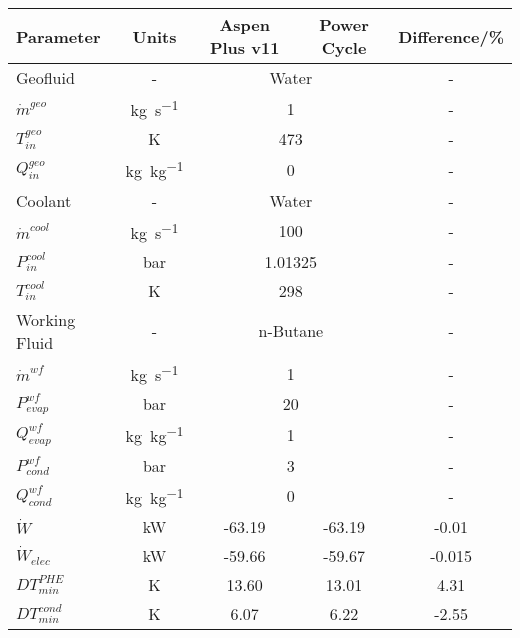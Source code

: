 \begin{tabular}{|p{3cm} c c c c|}
    \hline
    \rowcolor{bluepoli!40} %
    \textbf{Parameter} & \textbf{Units} & \textbf{Aspen Plus v11} & \textbf{Power Cycle} & \textbf{Difference/\unit{\percent}} \T\B \\
    \hline \hline
    Geofluid & - & \multicolumn{2}{c}{Water} & - \T\B\\
    \(\Dot{m}^{geo}\)  & \unit{\kg\per\s} & \multicolumn{2}{c}{\num{1}} & - \T\B\\
    \(T_{in}^{geo}\) & \unit{\K} & \multicolumn{2}{c}{\num{473}} & - \T\B\\
    \(Q_{in}^{geo}\) & \unit{\kg\per\kg} & \multicolumn{2}{c}{\num{0}} & - \T\B\\
    \hline
    Coolant & - & \multicolumn{2}{c}{Water} & - \T\B\\
    \(\Dot{m}^{cool}\)  & \unit{\kg\per\s} & \multicolumn{2}{c}{\num{100}} & - \T\B\\
    \(P_{in}^{cool}\) & \unit{\bar} & \multicolumn{2}{c}{\num{1.01325}} & - \T\B\\
    \(T_{in}^{cool}\) & \unit{\K} & \multicolumn{2}{c}{\num{298}} & - \T\B\\
    \hline
    Working Fluid & - & \multicolumn{2}{c}{n-Butane} & - \T\B\\
    \(\Dot{m}^{wf}\)  & \unit{\kg\per\s} & \multicolumn{2}{c}{\num{1}} & - \T\B\\
    \(P_{evap}^{wf}\) & \unit{\bar} & \multicolumn{2}{c}{\num{20}} & - \T\B\\
    \(Q_{evap}^{wf}\) & \unit{\kg\per\kg} & \multicolumn{2}{c}{\num{1}} & - \T\B\\
    \(P_{cond}^{wf}\) & \unit{\bar} & \multicolumn{2}{c}{\num{3}} & - \T\B\\
    \(Q_{cond}^{wf}\) & \unit{\kg\per\kg} & \multicolumn{2}{c}{\num{0}} & - \T\B\\
    \hline\hline
    \(\Dot{W}\) & \unit{\kilo\watt} & -63.19 & -63.19 & -0.01 \T\B\\
    \(\Dot{W}_{elec}\) & \unit{\kilo\watt} & -59.66 & -59.67 & -0.015 \T\B\\
    \(DT_{min}^{PHE}\) & \unit{\K} & 13.60 & 13.01 & 4.31 \T\B\\
    \(DT_{min}^{cond}\) & \unit{\K} & 6.07 & 6.22 & -2.55 \T\B\\
    \hline
\end{tabular}